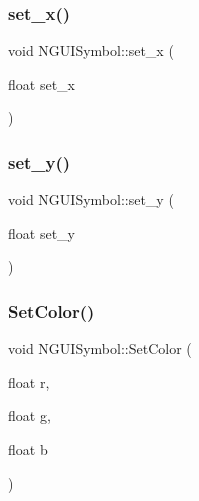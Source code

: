 \hypertarget{class_n_g_u_i_symbol_af70f704eb3b301dd17579f4c0b58767a}{}\label{class_n_g_u_i_symbol_af70f704eb3b301dd17579f4c0b58767a} 
\subsubsection{\texorpdfstring{set\+\_\+x()}{set\_x()}}
{\footnotesize\ttfamily void N\+G\+U\+I\+Symbol\+::set\+\_\+x (\begin{DoxyParamCaption}\item[{float}]{set\+\_\+x }\end{DoxyParamCaption})}

\hypertarget{class_n_g_u_i_symbol_ae538c34fdce6df905ab7f734f02a1a5c}{}\label{class_n_g_u_i_symbol_ae538c34fdce6df905ab7f734f02a1a5c} 
\subsubsection{\texorpdfstring{set\+\_\+y()}{set\_y()}}
{\footnotesize\ttfamily void N\+G\+U\+I\+Symbol\+::set\+\_\+y (\begin{DoxyParamCaption}\item[{float}]{set\+\_\+y }\end{DoxyParamCaption})}

\hypertarget{class_n_g_u_i_symbol_afb0aab44401a553ec6ee8e4c869b8fa4}{}\label{class_n_g_u_i_symbol_afb0aab44401a553ec6ee8e4c869b8fa4} 
\subsubsection{\texorpdfstring{Set\+Color()}{SetColor()}\hspace{0.1cm}{\footnotesize\ttfamily [1/2]}}
{\footnotesize\ttfamily void N\+G\+U\+I\+Symbol\+::\+Set\+Color (\begin{DoxyParamCaption}\item[{float}]{r,  }\item[{float}]{g,  }\item[{float}]{b }\end{DoxyParamCaption})}

\hypertarget{class_n_g_u_i_symbol_a5ad9d6f005111ee5ad2157e71527d760}{}\label{class_n_g_u_i_symbol_a5ad9d6f005111ee5ad2157e71527d760} 
